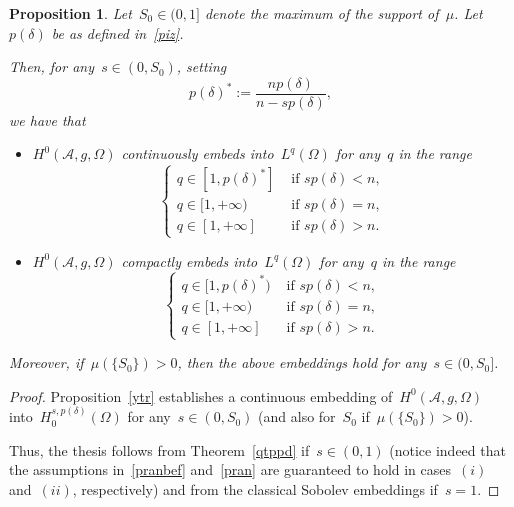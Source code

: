 \documentclass[11pt,hyp,]{nyjm}
\numberwithin{equation}{section}
\newtheorem{proposition}[theorem]{Proposition}
\theoremstyle{remark}
\newtheorem{remark}[theorem]{Remark}
\begin{document}
\begin{proposition}\label{qer}
Let~$S_0 \in (0,1]$ denote the maximum of the support of~$\mu$. Let~$p(\delta)$ be as defined in~\eqref{piz}.

Then, for any~$s \in (0,S_0)$, setting
$$ p(\delta)^*:=\frac{np(\delta)}{n-sp(\delta)},$$ we have that
\begin{itemize}
\item[(i)] $H^{0}(\mathcal{A}, g, \Omega)$ continuously embeds into~$L^q (\Omega)$ for any~$q$ in the range
		\begin{equation}
			\begin{cases}
				q \in [1,p(\delta)^*] & \mbox{ if } sp(\delta)<n ,\\
				q \in [1,+\infty) & \mbox{ if } sp(\delta)=n, \\
				q \in [1,+\infty] & \mbox{ if } sp(\delta)>n.
			\end{cases}
		\end{equation} 
\item[(ii)] $H^{0}(\mathcal{A}, g, \Omega)$ compactly embeds into~$L^q(\Omega)$ for any~$q$ in the range
		\begin{equation}
			\begin{cases}
				q \in [1,p(\delta)^*) & \mbox{ if } sp(\delta)<n, \\
				q \in [1,+\infty) & \mbox{ if } sp(\delta)=n, \\
				q \in [1,+\infty] & \mbox{ if } sp(\delta)>n.
			\end{cases}
\end{equation}
\end{itemize}

Moreover, if~$\mu(\{S_0\})>0$, then the above embeddings hold for any~$s \in (0,S_0]$.
\end{proposition}

\begin{proof}
Proposition~\ref{ytr} establishes a continuous embedding of~$H^{0}(\mathcal{A}, g, \Omega)$ into~$H_0^{s,p(\delta)}(\Omega)$ for any~$s\in(0,S_0)$ (and also for~$S_0$
if~$\mu(\{S_0\})>0$).

Thus, the thesis follows from
Theorem~\ref{qtppd} if~$s\in(0,1)$
(notice indeed that the assumptions in~\eqref{pranbef} and~\eqref{pran} are guaranteed to hold in cases~$(i)$ and~$(ii)$, respectively) and from the
classical Sobolev embeddings if~$s=1$.
\end{proof}

\end{document}
